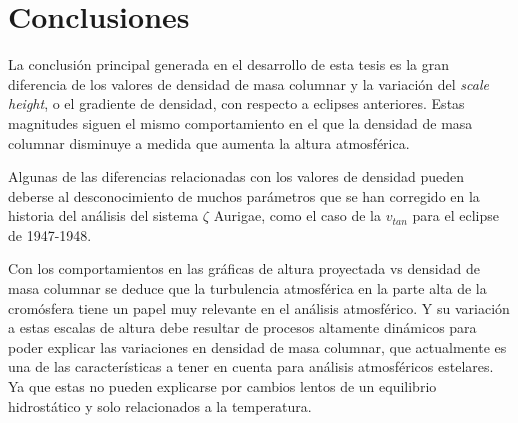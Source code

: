 \documentclass[12pt,oneside,openany,letter]{book}
\begin{document}

\chapter{Conclusiones}\label{conclusiones}

La conclusión principal generada en el desarrollo de esta tesis es la gran diferencia de los valores de densidad de masa columnar y la variación del \textit{scale height}, o el gradiente de densidad, con respecto a eclipses anteriores. Estas magnitudes siguen el mismo comportamiento en el que la densidad de masa columnar disminuye a medida que aumenta la altura atmosférica. 

Algunas de las diferencias relacionadas con los valores de densidad pueden deberse al desconocimiento de muchos parámetros que se han corregido en la historia del análisis del sistema $\zeta$ Aurigae, como el caso de la $v_{tan}$ para el eclipse de 1947-1948.

Con los comportamientos en las gráficas de altura proyectada vs densidad de masa columnar se deduce  que la turbulencia atmosférica en la parte alta de la cromósfera tiene un papel muy relevante en el análisis atmosférico. Y su variación a estas escalas de altura debe resultar de procesos altamente dinámicos para poder explicar las variaciones en densidad de masa columnar, que actualmente es una de las características a tener en cuenta para análisis atmosféricos estelares. Ya que estas no pueden explicarse por cambios lentos de un equilibrio hidrostático y solo relacionados a la temperatura.
\end{document}
